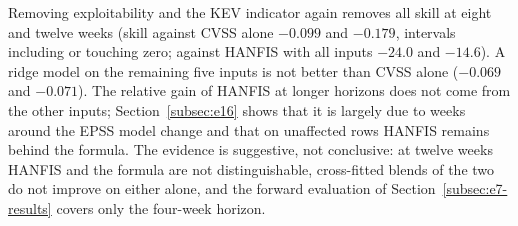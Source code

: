 \documentclass[pdflatex,sn-basic]{sn-jnl}
\theoremstyle{thmstyleone}%
\theoremstyle{thmstyletwo}%
\theoremstyle{thmstylethree}%
\begin{document}
Removing exploitability and the KEV indicator again removes all skill at eight and twelve weeks (skill against CVSS alone $-0.099$ and $-0.179$, intervals including or touching zero; against HANFIS with all inputs $-24.0$ and $-14.6$). A ridge model on the remaining five inputs is not better than CVSS alone ($-0.069$ and $-0.071$). The relative gain of HANFIS at longer horizons does not come from the other inputs; Section~\ref{subsec:e16} shows that it is largely due to weeks around the EPSS model change and that on unaffected rows HANFIS remains behind the formula. The evidence is suggestive, not conclusive: at twelve weeks HANFIS and the formula are not distinguishable, cross-fitted blends of the two do not improve on either alone, and the forward evaluation of Section~\ref{subsec:e7-results} covers only the four-week horizon.
\end{document}
